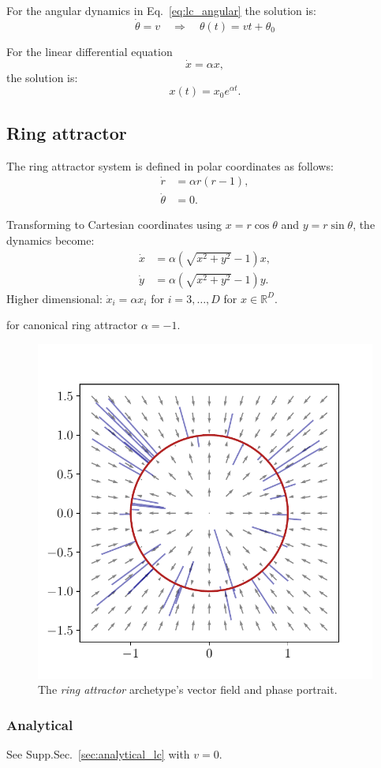 \documentclass{article}
\theoremstyle{definition} \newtheorem{definition}{Definition}  \newtheorem{example}{Example}
\theoremstyle{remark} \newtheorem{remark}{Remark}
\newcounter{ct}
\newcommand{\field}[1]{\ensuremath{\mathbb{#1}}}
\newcommand{\reals}{\field{R}}
\begin{document}
For the angular dynamics  in Eq.~\ref{eq:lc_angular} the solution is:
\[
\dot{\theta} = v
\quad \Rightarrow \quad 
\theta(t) = vt + \theta_0
\]

For the linear differential equation
\[
\dot{x} = \alpha x,
\]
the solution is:
\[
x(t) = x_0 e^{\alpha t}.
\]


\subsection{Ring attractor}\label{sec:ra}
The ring attractor system is defined in polar coordinates as follows:
\begin{equation}\label{eq:ra}
\begin{aligned}
\dot{r} &= \alpha r(r - 1), \\
\dot{\theta} &= 0.
\end{aligned}
\end{equation}

Transforming to Cartesian coordinates using \( x = r \cos\theta \) and \( y = r \sin\theta \), the dynamics become:
\[
\begin{aligned}
\dot{x} &= \alpha\left( \sqrt{x^2 + y^2} - 1 \right) x, \\
\dot{y} &= \alpha\left( \sqrt{x^2 + y^2} - 1 \right) y.
\end{aligned}
\]
Higher dimensional: $\dot x_i = \alpha x_i$ for $i=3, \dots, D$ for $x\in \reals^D$.

for canonical ring attractor $\alpha=-1$.

\begin{figure}[htbp]
    \centering
    \includegraphics[width=.5\linewidth]{ra_2d}
    \caption{The \emph{ring attractor} archetype's vector field and phase portrait.
     }
    \label{fig:ra_2d}
\end{figure}


\subsubsection{Analytical}
See Supp.Sec.~\ref{sec:analytical_lc} with $v=0$.
\end{document}
